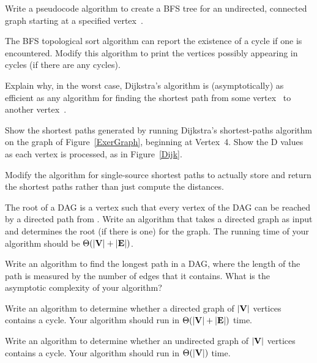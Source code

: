 \begin{exercises}
\item
Write a pseudocode algorithm to create a BFS tree for an undirected,
connected graph starting at a specified vertex~.

\item
The BFS topological sort algorithm can report the existence of a cycle
if one is encountered.
Modify this algorithm to print the vertices possibly appearing in
cycles (if there are any cycles).

\item
Explain why, in the worst case, Dijkstra's algorithm is
(asymptotically) as efficient as any algorithm for finding the
shortest path from some vertex~ to another vertex~.

\item
Show the shortest paths generated by running Dijkstra's shortest-paths
algorithm on the graph of Figure~\ref{ExerGraph}, beginning at
Vertex~4.
Show the D values as each vertex is processed, as in
Figure~\ref{Dijk}.

\item
Modify the algorithm for single-source shortest paths to actually
store and return the shortest paths rather than just compute the
distances.

\item
The root of a DAG is a vertex
 such that every vertex of the
DAG can be reached by a directed path from .
Write an algorithm that takes a directed graph as input and determines
the root (if there is one) for the graph.
The running time of your algorithm should be
\(\Theta(|{\textbf{V}}| + |{\textbf{E}}|)\).

\item
Write an algorithm to find the longest path in a DAG, where the length
of the path is measured by the number of edges that it contains.
What is the asymptotic complexity of your
algorithm?

\item
Write an algorithm to determine whether a directed graph of
\(|{\textbf{V}}|\) vertices contains a cycle.
Your algorithm should run in \(\Theta(|{\textbf{V}}| + |{\textbf{E}}|)\) time.

\item
Write an algorithm to determine whether an undirected graph of
\(|{\textbf{V}}|\) vertices contains a cycle.
Your algorithm should run in \(\Theta(|{\textbf{V}}|)\) time.


\end{exercises}
